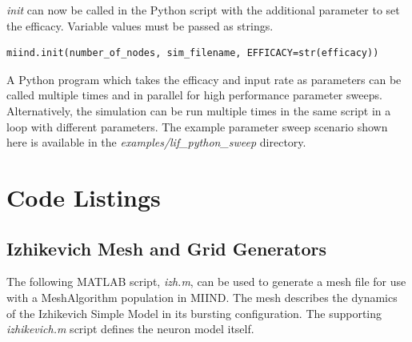 \documentclass[utf8]{frontiers_suppmat} %
\begin{document}
\textit{init} can now be called in the Python script with the additional parameter to set the efficacy. Variable values must be passed as strings.

\begin{lstlisting}
miind.init(number_of_nodes, sim_filename, EFFICACY=str(efficacy))
\end{lstlisting}

A Python program which takes the efficacy and input rate as parameters can be called multiple times and in parallel for high performance parameter sweeps. Alternatively, the simulation can be run multiple times in the same script in a loop with different parameters. The example parameter sweep scenario shown here is available in the \textit{examples/lif\_python\_sweep} directory.\\

\section{Code Listings}

\subsection{Izhikevich Mesh and Grid Generators}
\label{izhmesh}
The following MATLAB script, \textit{izh.m}, can be used to generate a mesh file for use with a MeshAlgorithm population in MIIND. The mesh describes the dynamics of the Izhikevich Simple Model \citep{izhikevich2003simple} in its bursting configuration. The supporting \textit{izhikevich.m} script defines the neuron model itself. \\
\end{document}
